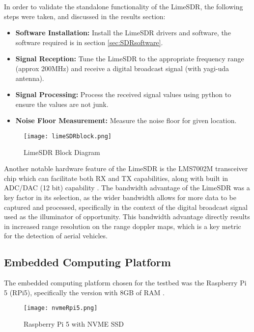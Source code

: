 In order to validate the standalone functionality of the LimeSDR, the following steps were taken, and discussed in the results section:
\begin{itemize}
    \item \textbf{Software Installation:} Install the LimeSDR drivers and software, the software required is in section \ref{sec:SDRsoftware}.
    \item \textbf{Signal Reception:} Tune the LimeSDR to the appropriate frequency range (approx 200MHz) and receive a digital broadcast signal (with yagi-uda antenna).
    \item \textbf{Signal Processing:} Process the received signal values using python to ensure the values are not junk.
    \item \textbf{Noise Floor Measurement:} Measure the noise floor for given location.
\end{itemize}

\begin{figure}[htbp]
    \centering
    \texttt{[image: limeSDRblock.png]}
    \caption{LimeSDR Block Diagram \cite{limesdr_usb}}
    \label{fig:limeSDRblock}
\end{figure}

Another notable hardware feature of the LimeSDR is the LMS7002M transceiver chip which can facilitate both RX and TX capabilities, along with built in ADC/DAC (12 bit) capability \cite{limesdr_usb}. The bandwidth advantage of the LimeSDR was a key factor in its selection, as the wider bandwidth allows for more data to be captured and processed, specifically in the context of the digital broadcast signal used as the illuminator of opportunity. This bandwidth advantage directly results in increased range resolution on the range doppler maps, which is a key metric for the detection of aerial vehicles. 


\subsection{Embedded Computing Platform \label{sec:embedded computing}}


The embedded computing platform chosen for the testbed was the Raspberry Pi 5 (RPi5), specifically the version with 8GB of RAM \cite{core_electronics_rpi5}. 

\begin{figure}[htbp]
    \centering
    \texttt{[image: nvmeRpi5.png]}
    \caption{Raspberry Pi 5 with NVME SSD \cite{pimoroni_nvme_base}}
    \label{fig:Rpi5}
\end{figure}


